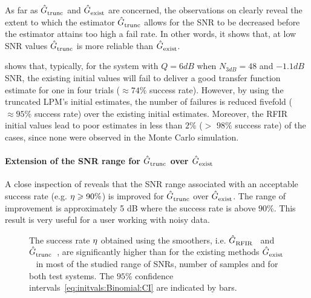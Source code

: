 As far as $\hat{G}_{\mathrm{trunc}}^{\mathrm{}}$ and $\hat{G}_{\mathrm{exist}}^{\mathrm{}}$ are concerned, the observations on  clearly reveal the extent to which the estimator $\hat{G}_{\mathrm{trunc}}^{\mathrm{}}$ allows for the SNR to be decreased before the estimator attains too high a fail rate. 
In other words, it shows that, at low SNR values $\hat{G}_{\mathrm{trunc}}^{\mathrm{}}$ is more reliable than $\hat{G}_{\mathrm{exist}}^{\mathrm{}}$. 

   shows that, typically, for the system with $Q=6\unit{dB}$ when $N_{3\unit{dB}}=48$ and $-1.1 \unit{dB}$ \gls{SNR}, the existing initial values will fail to deliver a good transfer function estimate for one in four trials ($\approx 74\%$ success rate).
However, by using the truncated \gls{LPM}'s initial estimates, the number of failures is reduced fivefold ($\approx 95\%$ success rate) over the existing initial estimates.
Moreover, the \gls{RFIR} initial values lead to poor estimates in less than $2\%$ ($>$ $98\%$ success rate) of the cases, since none were observed in the Monte Carlo simulation.

\paragraph*{Extension of the SNR range for $\hat{G}_{\mathrm{trunc}}^{\mathrm{}}$ over $\hat{G}_{\mathrm{exist}}^{\mathrm{}}$}
A close inspection of  reveals that the \gls{SNR} range associated with an acceptable success rate (e.g. $\eta \geqslant 90\%$) is improved for $\hat{G}_{\mathrm{trunc}}^{\mathrm{}}$ over $\hat{G}_{\mathrm{exist}}^{\mathrm{}}$. The range of improvement is approximately 5 dB where the success rate is above $90\%$. 
This result is very useful for a user working with noisy data.

\begin{figure}
  \centering
  \setlength{\figurewidth}{0.85\columnwidth}
  \setlength{\figureheight}{0.68\figurewidth}
  
 \caption[Simulated success rate of the different initialization schemes for varying \gls{SNR}.]{The success rate $\eta$  obtained using the smoothers, i.e. $\hat{G}_{\mathrm{RFIR}}^{\mathrm{}}$~ and $\hat{G}_{\mathrm{trunc}}^{\mathrm{}}$~, are significantly higher than for the existing methods $\hat{G}_{\mathrm{exist}}^{\mathrm{}}$~ in most of the studied range of \glspl{SNR}, number of samples and for both test systems. The $95\%$ confidence intervals~\eqref{eq:initvals:Binomial:CI} are indicated by bars.}
  \label{fig:successRateVS_SNR36N3dB}
\end{figure}

